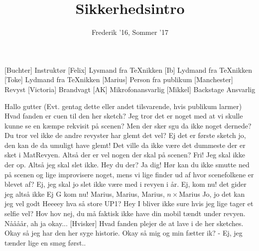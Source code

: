 \documentclass[a4paper,11pt]{article}
\title{Sikkerhedsintro}
\author{Frederik '16, Sommer '17}
\begin{document}
\maketitle

\begin{roles}
[Buchter] Instruktør
[Felix] Lysmand fra TeXnikken
[Ib] Lydmand fra TeXnikken
[Toke] Lydmand fra TeXnikken
[Marius] Person fra publikum
[Manchester] Revyst
[Victoria] Brandvagt
[AK] Mikrofonansvarlig
[Mikkel] Backstage Ansvarlig
\end{roles}

\begin{sketch}

 Hallo gutter (Evt. gentag dette eller andet tilsvarende, hvis publikum larmer)
 Hvad fanden er cuen til den her sketch?
 Jeg tror det er noget med at vi skulle kunne se en kæmpe rekvisit på scenen?
 Men der sker sgu da ikke noget dernede?
 Du tror vel ikke de andre revyster har glemt det vel?
 Ej det er første sketch jo, den kan de da umuligt have glemt!
 Det ville da ikke være det dummeste der er sket i MatRevyen.
 Altså der er vel nogen der skal på scenen? 
 Fri!
 Jeg skal ikke der op. 
 Altså jeg skal slet ikke. Hey du der?
 Ja dig! Hør kan du ikke smutte ned på scenen og lige improvisere noget, mens vi lige finder ud af hvor scenefolkene er blevet af?
 Ej, jeg skal jo slet ikke være med i revyen i år.
 Ej, kom nu!
 det gider jeg altså ikke
 Ej G kom nu!
 Marius, Marius, Marius, $n \times $Marius
 Jo, jo det kan jeg vel godt
 Heeeey hva så store UP1? Hey I bliver ikke sure hvis jeg lige tager et selfie vel?
 Hov hov nej, du må faktisk ikke have din mobil tændt under revyen.
 Nåååår, ah ja okay...
[Hvisker] Hvad fanden plejer de at lave i de her sketches.
Okay så jeg har den her syge historie. Okay så mig og min fætter ik? - Ej, jeg tænder lige en smøg først..

\end{sketch}
\end{document}
